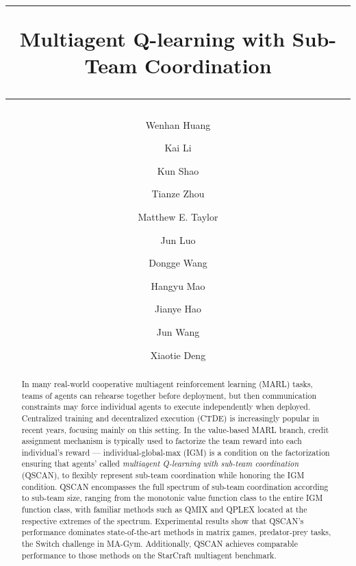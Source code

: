 
\begin{frontmatter}

\title{
\hrule height 2.5pt
\vskip 15pt
\textbf{Multiagent Q-learning with Sub-Team
Coordination}
\vskip 10pt
\hrule height .8pt
}


\author[1]{Wenhan Huang}
\author[2]{Kai Li}
\author[2]{Kun Shao}
\author[3]{Tianze Zhou}
\author[4,5]{Matthew E. Taylor}
\author[2]{Jun Luo}
\author[6]{Dongge Wang}
\author[2]{Hangyu Mao}
\author[2,7]{Jianye Hao}
\author[8]{Jun Wang}
\author[9]{Xiaotie Deng}


\address[1]{Shanghai Jiao Tong University}
\address[2]{Huawei Noah's Ark Lab}
\address[3]{Beijing Institute of Technology}
\address[4]{University of Alberta}
\address[5]{Alberta Machine Intelligence Institute (Amii)}
\address[6]{EPFL}
\address[7]{Tianjin University}
\address[8]{University College London}
\address[9]{Peking University}



\begin{abstract}
In many real-world cooperative multiagent reinforcement learning (MARL) tasks, teams of agents can rehearse together before deployment, but then communication constraints may force individual agents to execute independently when deployed. Centralized training and decentralized execution (CTDE) is increasingly popular in recent years, focusing mainly on this setting. In the value-based MARL branch, credit assignment mechanism is typically used to factorize the team reward into each individual’s reward — individual-global-max (IGM) is a condition on the factorization ensuring that agents’ called \emph{multiagent Q-learning with sub-team coordination }(QSCAN), to flexibly represent sub-team coordination while honoring the IGM condition. QSCAN encompasses the full spectrum of sub-team coordination according to sub-team size, ranging from the monotonic value function class to the entire IGM function class, with familiar methods such as QMIX and QPLEX located at the respective extremes of the spectrum. Experimental results show that QSCAN’s performance dominates state-of-the-art methods in matrix games, predator-prey tasks, the Switch challenge in MA-Gym. Additionally, QSCAN achieves comparable performance to those methods on the StarCraft multiagent benchmark.
\end{abstract}

\end{frontmatter}

